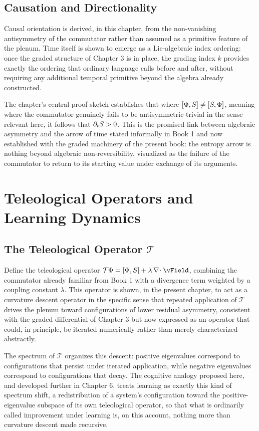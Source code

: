 \chapter{Causation and Directionality}

Causal orientation is derived, in this chapter, from the non-vanishing antisymmetry of the commutator rather than assumed as a primitive feature of the plenum. Time itself is shown to emerge as a Lie-algebraic index ordering: once the graded structure of Chapter 3 is in place, the grading index $k$ provides exactly the ordering that ordinary language calls before and after, without requiring any additional temporal primitive beyond the algebra already constructed.

The chapter's central proof sketch establishes that where $[\Phi, S] \neq [S, \Phi]$, meaning where the commutator genuinely fails to be antisymmetric-trivial in the sense relevant here, it follows that $\partial_t S > 0$. This is the promised link between algebraic asymmetry and the arrow of time stated informally in Book 1 and now established with the graded machinery of the present book: the entropy arrow is nothing beyond algebraic non-reversibility, visualized as the failure of the commutator to return to its starting value under exchange of its arguments.

\part{Teleological Operators and Learning Dynamics}

\chapter{The Teleological Operator $\mathcal{T}$}

Define the teleological operator $\mathcal{T}\PhiField = [\PhiField, \SEntropy] + \lambda \, \diverg \vField$, combining the commutator already familiar from Book 1 with a divergence term weighted by a coupling constant $\lambda$. This operator is shown, in the present chapter, to act as a curvature descent operator in the specific sense that repeated application of $\mathcal{T}$ drives the plenum toward configurations of lower residual asymmetry, consistent with the graded differential of Chapter 3 but now expressed as an operator that could, in principle, be iterated numerically rather than merely characterized abstractly.

The spectrum of $\mathcal{T}$ organizes this descent: positive eigenvalues correspond to configurations that persist under iterated application, while negative eigenvalues correspond to configurations that decay. The cognitive analogy proposed here, and developed further in Chapter 6, treats learning as exactly this kind of spectrum shift, a redistribution of a system's configuration toward the positive-eigenvalue subspace of its own teleological operator, so that what is ordinarily called improvement under learning is, on this account, nothing more than curvature descent made recursive.

